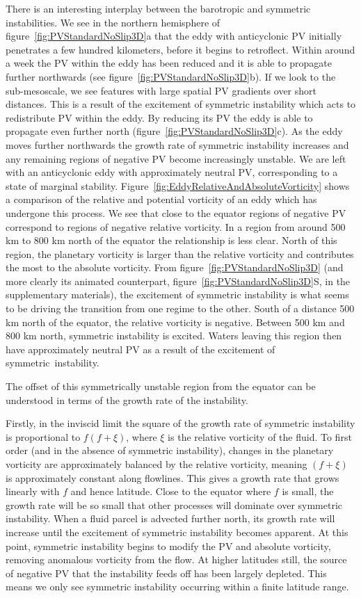     There is an interesting interplay between the barotropic and symmetric instabilities. We see in the northern hemisphere of figure~\ref{fig:PVStandardNoSlip3D}a that the eddy with anticyclonic PV initially penetrates a few hundred kilometers, before it begins to retroflect. Within around a week the PV within the eddy has been reduced and it is able to propagate further northwards (see figure~\ref{fig:PVStandardNoSlip3D}b). If we look to the sub-mesoscale, we see  features with large spatial PV gradients over short distances. This is a result of the excitement of  symmetric instability which acts to redistribute PV within the eddy. By reducing its PV the eddy is able to propagate even further north (figure~\ref{fig:PVStandardNoSlip3D}c). As the eddy moves further northwards the growth rate of symmetric instability increases and any remaining regions of negative PV become increasingly unstable. We are left with an anticyclonic eddy with approximately neutral PV, corresponding to a state of marginal stability. Figure~\ref{fig:EddyRelativeAndAbsoluteVorticity} shows a comparison of the relative and potential vorticity of an eddy which has undergone this process. We see that close to the equator regions of negative PV correspond to regions of negative relative vorticity. In a region from around 500 km to 800 km north of the equator the relationship is less clear. North of this region, the planetary vorticity is larger than the relative vorticity and contributes the most to the absolute vorticity. From figure~\ref{fig:PVStandardNoSlip3D} (and more clearly its animated counterpart, figure~\ref{fig:PVStandardNoSlip3D}S, in the supplementary materials), the excitement of symmetric instability is what seems to be driving the transition from one regime to the other. South of a distance 500 km north of the equator, the relative vorticity is negative. Between 500 km and 800 km north, symmetric instability is excited. Waters leaving this region then have approximately neutral PV as a result of the excitement of symmetric\ instability.

    The offset of this symmetrically unstable region from the equator can be understood in terms of the growth rate of the instability.
    
    Firstly, in the inviscid limit the square of the growth rate of symmetric instability is proportional to $f(f + \xi)$, where $\xi$ is the relative vorticity of the fluid. To first order (and in the absence of symmetric instability), changes in the planetary vorticity are approximately balanced by the relative vorticity, meaning $(f + \xi)$ is approximately constant along flowlines. This gives a growth rate that grows linearly with $f$ and hence latitude. Close to the equator where $f$ is small, the growth rate will be so small that other processes will dominate over symmetric instability. When a fluid parcel is advected further north, its growth rate will increase until the excitement of symmetric instability becomes apparent. At this point, symmetric instability begins to modify the PV and absolute vorticity, removing anomalous vorticity from the flow. At higher latitudes still, the source of negative PV that the instability feeds off has been largely depleted. This means we only see symmetric instability occurring within a finite latitude range.

